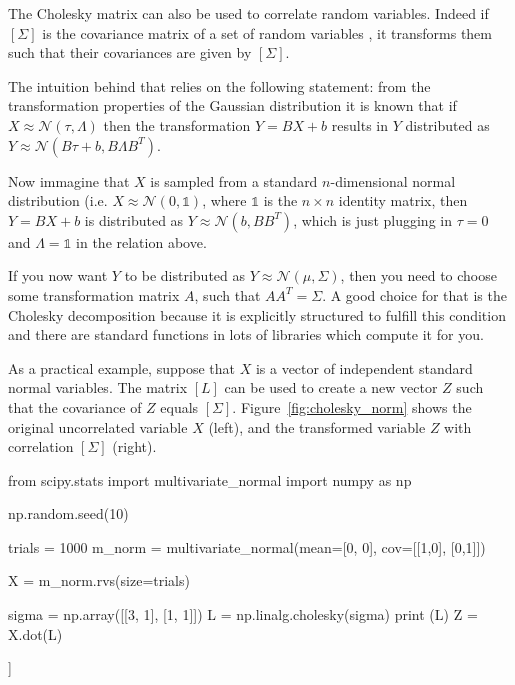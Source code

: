 The Cholesky matrix can also be used to correlate random variables. Indeed if $[\Sigma]$ is the covariance matrix of a set of random variables , it transforms them such that their covariances are given by $[\Sigma]$. 

The intuition behind that relies on the following statement: from the transformation properties of the Gaussian distribution it is known that if $X\approx\mathcal{N}(\tau,\Lambda)$ then the transformation $Y=BX+b$ results in $Y$ distributed as $Y\approx\mathcal{N}(B\tau +b,B\Lambda B^{T})$.

Now immagine that $X$ is sampled from a standard $n$-dimensional normal distribution (i.e. $X\approx\mathcal{N}(0,\mathbb{1})$, where $\mathbb{1}$ is the $n\times n$ identity matrix, then $Y=BX+b$ is distributed as $Y\approx\mathcal{N}(b,BB^{T})$, which is just plugging in $\tau=0$ and $\Lambda=\mathbb{1}$ in the relation above.

If you now want $Y$ to be distributed as $Y\approx\mathcal{N}(\mu,\Sigma)$, then you need to choose some transformation matrix $A$, such that $AA^{T}=\Sigma$. A good choice for that is the Cholesky decomposition because it is explicitly structured to fulfill this condition and there are standard functions in lots of libraries which compute it for you.

As a practical example, suppose that $X$ is a vector of independent standard normal variables. The matrix $[L]$ can be used to create a new vector $Z$ such that the covariance of $Z$ equals $[\Sigma]$.
Figure~\ref{fig:cholesky_norm} shows the original uncorrelated variable $X$ (left), and the transformed variable $Z$ with correlation $[\Sigma]$ (right).

\begin{ipython}
from scipy.stats import multivariate_normal
import numpy as np

np.random.seed(10)

trials = 1000
m_norm = multivariate_normal(mean=[0, 0], cov=[[1,0],
                                               [0,1]])

X = m_norm.rvs(size=trials)

sigma = np.array([[3, 1], [1, 1]])
L = np.linalg.cholesky(sigma)
print (L)
Z = X.dot(L)
\end{ipython}
\begin{ioutput}
[[1.73205081 0.        ]
 [0.57735027 0.81649658]]
\end{ioutput}

